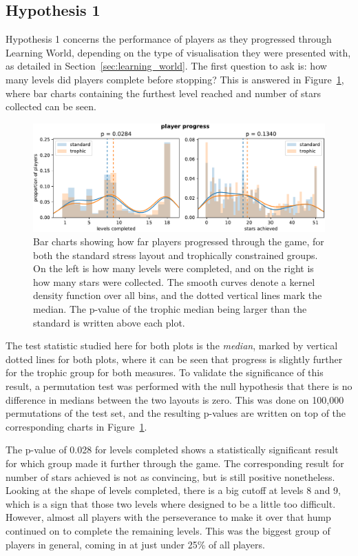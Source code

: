 \subsection{Hypothesis 1}
\label{sec:hypothesis1}
Hypothesis 1 concerns the performance of players as they progressed through Learning World, depending on the type of visualisation they were presented with, as detailed in Section~\ref{sec:learning_world}.
The first question to ask is: how many levels did players complete before stopping? This is answered in Figure~\ref{fig:player_progression}, where bar charts containing the furthest level reached and number of stars collected can be seen.
\begin{figure}
    \centering
    \includegraphics[width=\textwidth]{joy/stars.pdf}
    \caption[Bar charts showing player progressed]{Bar charts showing how far players progressed through the game, for both the standard stress layout and trophically constrained groups. On the left is how many levels were completed, and on the right is how many stars were collected. The smooth curves denote a kernel density function over all bins, and the dotted vertical lines mark the median. The p-value of the trophic median being larger than the standard is written above each plot.}
    \label{fig:player_progression}
\end{figure}
The test statistic studied here for both plots is the \emph{median}, marked by vertical dotted lines for both plots, where it can be seen that progress is slightly further for the trophic group for both measures.
To validate the significance of this result, a permutation test was performed with the null hypothesis that there is no difference in medians between the two layouts is zero.
This was done on 100,000 permutations of the test set, and the resulting p-values are written on top of the corresponding charts in Figure~\ref{fig:player_progression}.

The p-value of 0.028 for levels completed shows a statistically significant result for which group made it further through the game. The corresponding result for number of stars achieved is not as convincing, but is still positive nonetheless.
Looking at the shape of levels completed, there is a big cutoff at levels 8 and 9, which is a sign that those two levels where designed to be a little too difficult. However, almost all players with the perseverance to make it over that hump continued on to complete the remaining levels. This was the biggest group of players in general, coming in at just under 25\% of all players.

